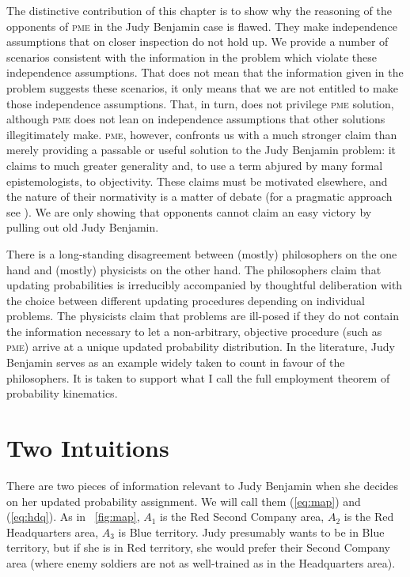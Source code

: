\documentclass[phd,12pt,oneside]{ubcthesis}
\begin{document}
The distinctive contribution of this chapter is to show why the
reasoning of the opponents of \textsc{pme} in the Judy Benjamin
case is flawed. They make independence assumptions that on closer
inspection do not hold up. We provide a number of scenarios consistent
with the information in the problem which violate these independence
assumptions. That does not mean that the information given in the
problem suggests these scenarios, it only means that we are not
entitled to make those independence assumptions. That, in turn, does
not privilege \textsc{pme} solution, although \textsc{pme}
does not lean on independence assumptions that other solutions
illegitimately make. \textsc{pme}, however, confronts us with a
much stronger claim than merely providing a passable or useful
solution to the Judy Benjamin problem: it claims to much greater
generality and, to use a term abjured by many formal epistemologists,
to objectivity. These claims must be motivated elsewhere, and the
nature of their normativity is a matter of debate (for a pragmatic
approach see ). We are only showing that
opponents cannot claim an easy victory by pulling out old Judy
Benjamin.

There is a long-standing disagreement between (mostly) philosophers on
the one hand and (mostly) physicists on the other hand. The
philosophers claim that updating probabilities is irreducibly
accompanied by thoughtful deliberation with the choice between
different updating procedures depending on individual problems. The
physicists claim that problems are ill-posed if they do not contain
the information necessary to let a non-arbitrary, objective procedure
(such as \textsc{pme}) arrive at a unique updated probability
distribution. In the literature, Judy Benjamin serves as an example
widely taken to count in favour of the philosophers. It is taken to
support what I call the full employment theorem of probability
kinematics.

\section{Two Intuitions}
\label{sec:daingeum}

There are two pieces of information relevant to Judy Benjamin
when she decides on her updated probability assignment. We will call
them ({\ref{eq:map}}) and ({\ref{eq:hdq}}). As in
{\igure}~\ref{fig:map}, $A_{1}$ is the Red Second Company area, $A_{2}$ is
the Red Headquarters area, $A_{3}$ is Blue territory. Judy presumably
wants to be in Blue territory, but if she is in Red territory, she
would prefer their Second Company area (where enemy soldiers are not
as well-trained as in the Headquarters area).
\end{document}
